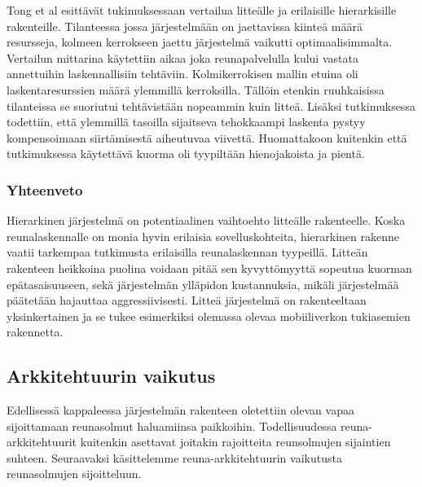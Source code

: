Tong et al \cite{tong2016hierarchical} esittävät tukimuksessaan vertailua litteälle ja erilaisille hierarkisille rakenteille. Tilanteessa jossa järjestelmään on jaettavissa kiinteä määrä resursseja, kolmeen kerrokseen jaettu järjestelmä vaikutti optimaalisimmalta.
Vertailun mittarina käytettiin aikaa joka reunapalvelulla kului vastata annettuihin laskennallisiin tehtäviin. Kolmikerrokisen mallin etuina oli laskentaresurssien määrä ylemmillä kerroksilla. Tällöin etenkin ruuhkaisissa tilanteissa se suoriutui tehtävistään nopeammin kuin litteä. Lisäksi tutkimuksessa todettiin, että ylemmillä tasoilla sijaitseva tehokkaampi laskenta pystyy kompensoimaan siirtämisestä aiheutuvaa viivettä. Huomattakoon kuitenkin että tutkimuksessa käytettävä kuorma oli tyypiltään hienojakoista ja pientä. 


\subsubsection{Yhteenveto}
Hierarkinen järjestelmä on potentiaalinen vaihtoehto litteälle rakenteelle. Koska reunalaskennalle on monia hyvin erilaisia sovelluskohteita, hierarkinen rakenne vaatii tarkempaa tutkimusta erilaisilla reunalaskennan tyypeillä. Litteän rakenteen heikkoina puolina voidaan pitää sen kyvyttömyyttä sopeutua kuorman epätasaisuuseen, sekä järjestelmän ylläpidon kustannuksia, mikäli järjestelmää päätetään hajauttaa aggressiivisesti. Litteä järjestelmä on rakenteeltaan yksinkertainen ja se tukee esimerkiksi olemassa olevaa mobiiliverkon tukiasemien rakennetta. 


\subsection{Arkkitehtuurin vaikutus}
Edellisessä kappaleessa järjestelmän rakenteen oletettiin olevan vapaa sijoittamaan reunasolmut haluamiinsa paikkoihin. 
Todellisuudessa reuna-arkkitehtuurit kuitenkin asettavat joitakin rajoitteita reunsolmujen sijaintien suhteen. Seuraavaksi käsittelemme reuna-arkkitehtuurin vaikutusta reunasolmujen sijoitteluun.

